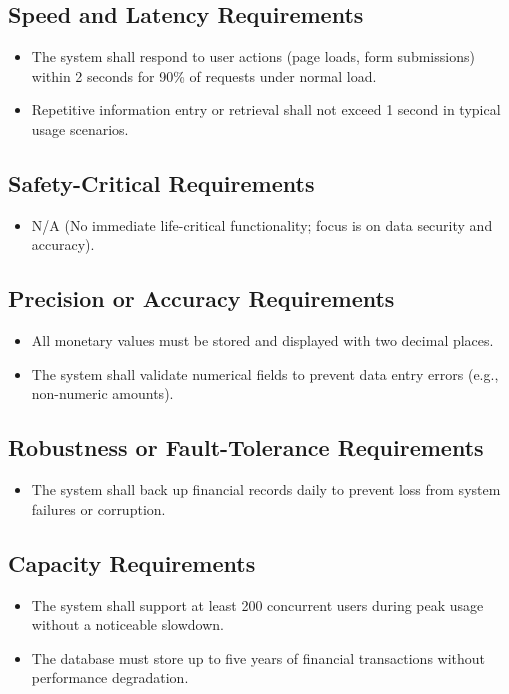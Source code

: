 \documentclass[12pt]{article}
\begin{document}
\subsection{Speed and Latency Requirements}
\begin{itemize}
    \item The system shall respond to user actions (page loads, form submissions) within 2 seconds for 90\% of requests under normal load.
    \item Repetitive information entry or retrieval shall not exceed 1 second in typical usage scenarios.
\end{itemize}

\subsection{Safety-Critical Requirements}
\begin{itemize}
  \item N/A (No immediate life-critical functionality; focus is on data security and accuracy).
\end{itemize}

\subsection{Precision or Accuracy Requirements}
\begin{itemize}
    \item All monetary values must be stored and displayed with two decimal places.
    \item The system shall validate numerical fields to prevent data entry errors (e.g., non-numeric amounts).
\end{itemize}

\subsection{Robustness or Fault-Tolerance Requirements}
\begin{itemize}
    \item The system shall back up financial records daily to prevent loss from system failures or corruption.
\end{itemize}

\subsection{Capacity Requirements}
\begin{itemize}
    \item The system shall support at least 200 concurrent users during peak usage without a noticeable slowdown.
    \item The database must store up to five years of financial transactions without performance degradation.
\end{itemize}
\end{document}
